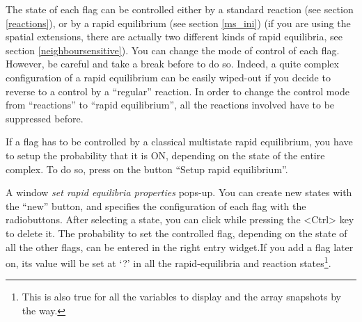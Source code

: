 The state of each flag can be controlled either by a standard reaction (see
section \ref{reactions}), or by a rapid equilibrium (see section \ref{ms_ini})
(if you are using the spatial extensions, there are actually two different kinds
of rapid equilibria, see section \ref{neighboursensitive}). You can change the
mode of control of each flag.  However, be careful and take a break before to do
so. Indeed, a quite complex configuration of a rapid equilibrium can be easily
wiped-out if you decide to reverse to a control by a ``regular'' reaction. In
order to change the control mode from ``reactions'' to ``rapid equilibrium'',
all the reactions involved have to be suppressed before.

If a flag has to be controlled by a classical multistate rapid equilibrium, you
have to setup the probability that it is ON, depending on the state of the
entire complex. To do so, press on the button ``Setup rapid equilibrium''.

 A window \emph{set
  rapid equilibria properties} pops-up. You can create new states with the
``new'' button, and specifies the configuration of each flag with the
radiobuttons.  After selecting a state, you can click while pressing the <Ctrl>
key to delete it. The probability to set the controlled flag, depending on the
state of all the other flags, can be entered in the right entry widget.If you
add a flag later on, its value will be set at `?' in all the rapid-equilibria
and reaction states\footnote{This is also true for all the variables to display
  and the array snapshots by the way.}.


